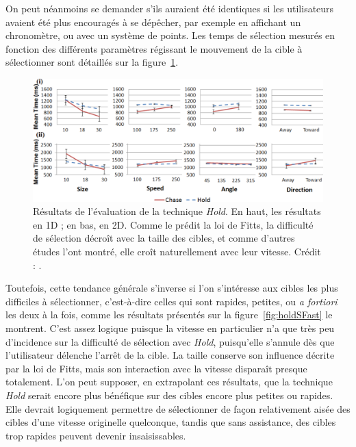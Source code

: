\begin{appendices}
	On peut néanmoins se demander s'ils auraient été identiques si les utilisateurs avaient été plus encouragés à se dépêcher, par exemple en affichant un chronomètre, ou avec un système de points. Les temps de sélection mesurés en fonction des différents paramètres régissant le mouvement de la cible à sélectionner sont détaillés sur la figure~\ref{fig:holdRes}.
	
	\begin{figure}[!htbp]
		\centering
		\includegraphics[width=\textwidth]{figures/ch2/holdRes}
		\caption[\emph{Hold} -- évaluation]{Résultats de l'évaluation de la technique \emph{Hold}. En haut, les résultats en 1D ; en bas, en 2D. Comme le prédit la loi de Fitts, la difficulté de sélection décroît avec la taille des cibles, et comme d'autres études l'ont montré, elle croît naturellement avec leur vitesse.  Crédit : \cite{hajri2011moving}.}
		\label{fig:holdRes}
	\end{figure}
	
	Toutefois, cette tendance générale s'inverse si l'on s'intéresse aux cibles les plus difficiles à sélectionner, c'est-à-dire celles qui sont rapides, petites, ou \emph{a fortiori} les deux à la fois, comme les résultats présentés sur la figure~\ref{fig:holdSFast} le montrent. C'est assez logique puisque la vitesse en particulier n'a que très peu d'incidence sur la difficulté de sélection avec \emph{Hold}, puisqu'elle s'annule dès que l'utilisateur délenche l'arrêt de la cible. La taille conserve son influence décrite par la loi de Fitts, mais son interaction avec la vitesse disparaît presque totalement. L'on peut supposer, en extrapolant ces résultats, que la technique \emph{Hold} serait encore plus bénéfique sur des cibles encore plus petites ou rapides. Elle devrait logiquement permettre de sélectionner de façon relativement aisée des cibles d'une vitesse originelle quelconque, tandis que sans assistance, des cibles trop rapides peuvent devenir insaisissables.
	

\end{appendices}
